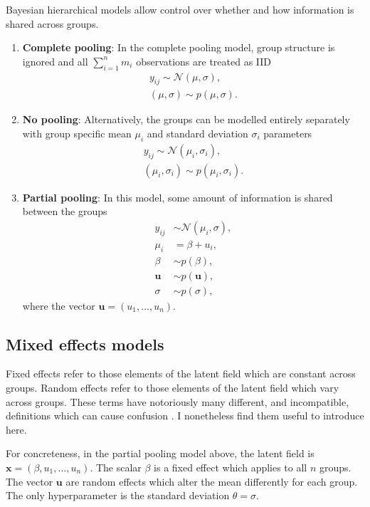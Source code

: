 \documentclass[a4paper, nobind]{templates/ociamthesis}
\providecommand{\tightlist}{%
  \setlength{\itemsep}{0pt}\setlength{\parskip}{0pt}}
\begin{document}
Bayesian hierarchical models allow control over whether and how information is shared across groups.

\begin{enumerate}
\def\labelenumi{\arabic{enumi}.}
\tightlist
\item
  \textbf{Complete pooling}:
  In the complete pooling model, group structure is ignored and all \(\sum_{i = 1}^n m_i\) observations are treated as IID
  \begin{align}
  y_{ij} \sim \mathcal{N}(\mu, \sigma), \\
  (\mu, \sigma) \sim p(\mu, \sigma).
  \end{align}
\item
  \textbf{No pooling}:
  Alternatively, the groups can be modelled entirely separately with group specific mean \(\mu_i\) and standard deviation \(\sigma_i\) parameters
  \begin{align}
  y_{ij} \sim \mathcal{N}(\mu_i, \sigma_i), \\
  (\mu_i, \sigma_i) \sim p(\mu_i, \sigma_i).
  \end{align}
\item
  \textbf{Partial pooling}:
  In this model, some amount of information is shared between the groups
  \begin{align}
  y_{ij} &\sim \mathcal{N}(\mu_i, \sigma), \\
  \mu_i &= \beta + u_i, \\
  \beta &\sim p(\beta), \\
  \mathbf{u} &\sim p(\mathbf{u}), \\
  \sigma &\sim p(\sigma),
  \end{align}
  where the vector \(\mathbf{u} = (u_1, \ldots, u_n)\).
\end{enumerate}

\hypertarget{mixed-effects-models}{%
\subsection{Mixed effects models}\label{mixed-effects-models}}

Fixed effects refer to those elements of the latent field which are constant across groups.
Random effects refer to those elements of the latent field which vary across groups.
These terms have notoriously many different, and incompatible, definitions which can cause confusion \autocite{gelman2005analysis}.
I nonetheless find them useful to introduce here.

For concreteness, in the partial pooling model above, the latent field is \(\mathbf{x} = (\beta, u_1, \ldots, u_n)\).
The scalar \(\beta\) is a fixed effect which applies to all \(n\) groups.
The vector \(\mathbf{u}\) are random effects which alter the mean differently for each group.
The only hyperparameter is the standard deviation \(\theta = \sigma\).
\end{document}

